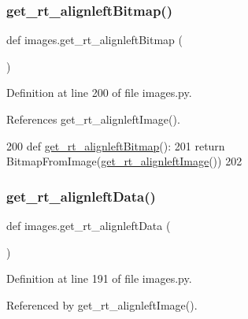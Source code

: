\subsubsection{\texorpdfstring{get\+\_\+rt\+\_\+alignleft\+Bitmap()}{get\_rt\_alignleftBitmap()}}
{\footnotesize\ttfamily def images.\+get\+\_\+rt\+\_\+alignleft\+Bitmap (\begin{DoxyParamCaption}{ }\end{DoxyParamCaption})}



Definition at line 200 of file images.\+py.



References get\+\_\+rt\+\_\+alignleft\+Image().


\begin{DoxyCode}
200 \textcolor{keyword}{def }\hyperlink{namespaceimages_a0b99c798ef63b6b70e955821166a880e}{get\_rt\_alignleftBitmap}():
201     \textcolor{keywordflow}{return} BitmapFromImage(\hyperlink{namespaceimages_ac5bb51ed178a2b8654577b5a450c2a95}{get\_rt\_alignleftImage}())
202 
\end{DoxyCode}
\mbox{\label{namespaceimages_aca3df35d167083df9d30d2d01cb284d9}} 
\subsubsection{\texorpdfstring{get\+\_\+rt\+\_\+alignleft\+Data()}{get\_rt\_alignleftData()}}
{\footnotesize\ttfamily def images.\+get\+\_\+rt\+\_\+alignleft\+Data (\begin{DoxyParamCaption}{ }\end{DoxyParamCaption})}



Definition at line 191 of file images.\+py.



Referenced by get\+\_\+rt\+\_\+alignleft\+Image().



